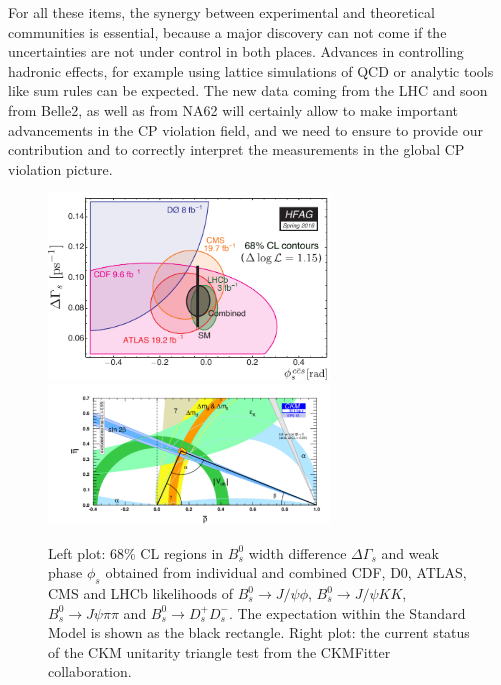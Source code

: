 For all these items, the synergy between experimental and theoretical communities is essential, because a major discovery can not come if the uncertainties are not under control in both places. Advances in controlling
hadronic effects, for example using lattice simulations of QCD or analytic 
tools like sum rules can be expected.
 The new data coming from the LHC and soon from Belle2, as well as from NA62 will certainly allow to make important advancements in the CP violation field, and we need to ensure to provide our contribution and to correctly interpret the measurements in the global CP violation picture. 


\begin{figure}[!htb]
\begin{center}
\includegraphics[width=7.5cm]{hfag_Spring2016_DGsphis_zoom.pdf}
\includegraphics[width=7.5cm]{rhoeta_small_global.pdf}
\end{center}
\caption{Left plot: 68\% CL regions in $B^{0}_{s}$ width difference $\Delta\Gamma_{s}$
and weak phase $\phi_{s}$ obtained from individual and combined CDF, D0,
ATLAS, CMS and LHCb likelihoods of $B^{0}_{s}\to J/\psi\phi$, $B^{0}_{s}\to
J/\psi KK$, $B^{0}_{s}\to J\psi\pi\pi$ and $B^{0}_{s}\to D_{s}^{+}D_{s}^{-}%
$. The expectation within the Standard Model is shown as the black rectangle. Right plot: the current status of the CKM unitarity triangle test from the CKMFitter collaboration. }%
\label{figphis}%
\end{figure}



